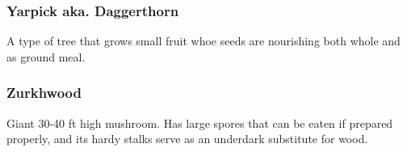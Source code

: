 \subsubsection{Yarpick aka. Daggerthorn}

A type of tree that grows small fruit whoe seeds are nourishing both whole and as ground meal.

\subsubsection{Zurkhwood}

Giant 30-40 ft high mushroom. Has large spores that can be eaten if prepared properly, and its hardy stalks serve as an underdark substitute for wood.
